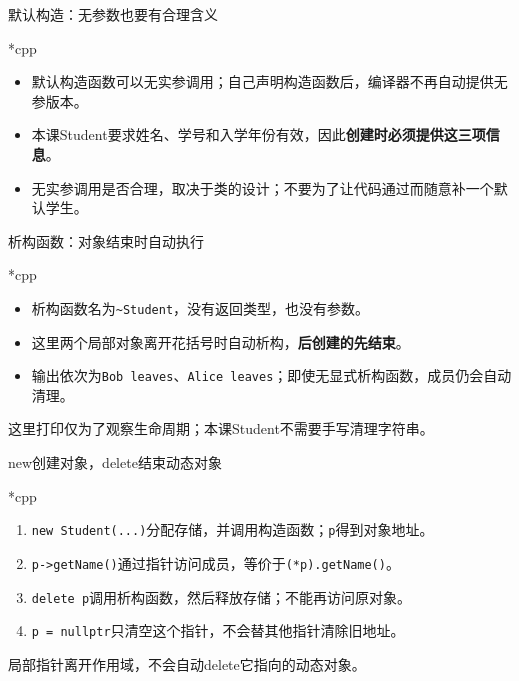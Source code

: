 \begin{frame}{默认构造：无参数也要有合理含义}
    \begin{Code}*{cpp}
        
    \end{Code}
    \begin{itemize}
        \item 默认构造函数可以无实参调用；自己声明构造函数后，编译器不再自动提供无参版本。
        \item 本课Student要求姓名、学号和入学年份有效，因此\textbf{创建时必须提供这三项信息}。
        \item 无实参调用是否合理，取决于类的设计；不要为了让代码通过而随意补一个默认学生。
    \end{itemize}
\end{frame}

\begin{frame}{析构函数：对象结束时自动执行}
    \begin{Code}*{cpp}
        
    \end{Code}
    \begin{itemize}
        \item 析构函数名为\texttt{\textasciitilde Student}，没有返回类型，也没有参数。
        \item 这里两个局部对象离开花括号时自动析构，\textbf{后创建的先结束}。
        \item 输出依次为\texttt{Bob leaves}、\texttt{Alice leaves}；即使无显式析构函数，成员仍会自动清理。
    \end{itemize}
    \alert{这里打印仅为了观察生命周期；本课Student不需要手写清理字符串。}
\end{frame}

\begin{frame}{new创建对象，delete结束动态对象}
    \begin{Code}*{cpp}
        
    \end{Code}
    \begin{enumerate}
        \item \texttt{new Student(...)}分配存储，并调用构造函数；\texttt{p}得到对象地址。
        \item \texttt{p->getName()}通过指针访问成员，等价于\texttt{(*p).getName()}。
        \item \texttt{delete p}调用析构函数，然后释放存储；不能再访问原对象。
        \item \texttt{p = nullptr}只清空这个指针，不会替其他指针清除旧地址。
    \end{enumerate}
    \alert{局部指针离开作用域，不会自动delete它指向的动态对象。}
\end{frame}

